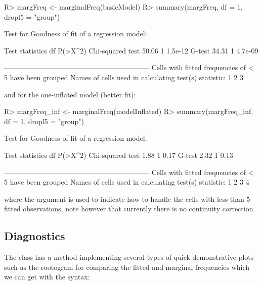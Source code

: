\documentclass[
]{jss}
\newcommand{\1}{\mathcal{I}} \newcommand{\bZero}{\boldsymbol{0}}
\begin{document}
\begin{CodeChunk}
\begin{CodeInput}
R> margFreq <- marginalFreq(basicModel)
R> summary(margFreq, df = 1, dropl5 = "group")
\end{CodeInput}
\begin{CodeOutput}
Test for Goodness of fit of a regression model:

                 Test statistics df P(>X^2)
Chi-squared test           50.06  1 1.5e-12
G-test                     34.31  1 4.7e-09

-------------------------------------------------------------- 
Cells with fitted frequencies of < 5 have been grouped 
Names of cells used in calculating test(s) statistic: 1 2 3  
\end{CodeOutput}
\end{CodeChunk}

and for the one-inflated model (better fit):

\begin{CodeChunk}
\begin{CodeInput}
R> margFreq_inf <- marginalFreq(modelInflated)
R> summary(margFreq_inf, df = 1, dropl5 = "group")
\end{CodeInput}
\begin{CodeOutput}
Test for Goodness of fit of a regression model:

                 Test statistics df P(>X^2)
Chi-squared test            1.88  1    0.17
G-test                      2.32  1    0.13

-------------------------------------------------------------- 
Cells with fitted frequencies of < 5 have been grouped 
Names of cells used in calculating test(s) statistic: 1 2 3 4  
\end{CodeOutput}
\end{CodeChunk}

where the  argument is used to indicate how to handle the
cells with less than \(5\) fitted observations, note however that
currently there is no continuity correction.

\subsection{Diagnostics}\label{diagnostics}

The  class has a  method
implementing several types of quick demonstrative plots such as the
rootogram \citep[cf.][]{rootogram} for comparing the fitted and marginal
frequencies which we can get with the syntax:
\end{document}
